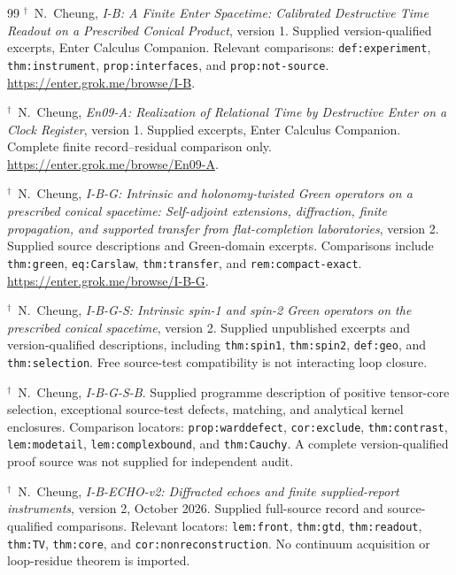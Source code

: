 \documentclass[11pt,a4paper]{article}
\newcommand{\loc}[1]{\nolinkurl{#1}}
\theoremstyle{plain}
\theoremstyle{definition}
\theoremstyle{remark}
\numberwithin{equation}{section}
\begin{document}
\begin{thebibliography}{99}
\(^{\dagger}\)\ N.~Cheung,
\emph{I-B: A Finite Enter Spacetime:
Calibrated Destructive Time Readout on a Prescribed Conical Product},
version 1.
Supplied version-qualified excerpts, Enter Calculus Companion.
Relevant comparisons:
\loc{def:experiment}, \loc{thm:instrument},
\loc{prop:interfaces}, and \loc{prop:not-source}.
\url{https://enter.grok.me/browse/I-B}.

\(^{\dagger}\)\ N.~Cheung,
\emph{En09-A: Realization of Relational Time by Destructive Enter
on a Clock Register},
version 1.
Supplied excerpts, Enter Calculus Companion.
Complete finite record--residual comparison only.
\url{https://enter.grok.me/browse/En09-A}.

\(^{\dagger}\)\ N.~Cheung,
\emph{I-B-G: Intrinsic and holonomy-twisted Green operators on a
prescribed conical spacetime:
Self-adjoint extensions, diffraction, finite propagation,
and supported transfer from flat-completion laboratories},
version 2.
Supplied source descriptions and Green-domain excerpts.
Comparisons include \loc{thm:green}, \loc{eq:Carslaw},
\loc{thm:transfer}, and \loc{rem:compact-exact}.
\url{https://enter.grok.me/browse/I-B-G}.

\(^{\dagger}\)\ N.~Cheung,
\emph{I-B-G-S: Intrinsic spin-1 and spin-2 Green operators on the
prescribed conical spacetime},
version 2.
Supplied unpublished excerpts and version-qualified descriptions,
including \loc{thm:spin1}, \loc{thm:spin2},
\loc{def:geo}, and \loc{thm:selection}.
Free source-test compatibility is not interacting loop closure.

\(^{\dagger}\)\ N.~Cheung,
\emph{I-B-G-S-B}.
Supplied programme description of positive tensor-core selection,
exceptional source-test defects, matching, and analytical kernel
enclosures.
Comparison locators:
\loc{prop:warddefect}, \loc{cor:exclude},
\loc{thm:contrast}, \loc{lem:modetail},
\loc{lem:complexbound}, and \loc{thm:Cauchy}.
A complete version-qualified proof source was not supplied for
independent audit.

\(^{\dagger}\)\ N.~Cheung,
\emph{I-B-ECHO-v2: Diffracted echoes and finite supplied-report
instruments},
version 2, October 2026.
Supplied full-source record and source-qualified comparisons.
Relevant locators:
\loc{lem:front}, \loc{thm:gtd}, \loc{thm:readout},
\loc{thm:TV}, \loc{thm:core},
and \loc{cor:nonreconstruction}.
No continuum acquisition or loop-residue theorem is imported.


\end{thebibliography}
\end{document}
